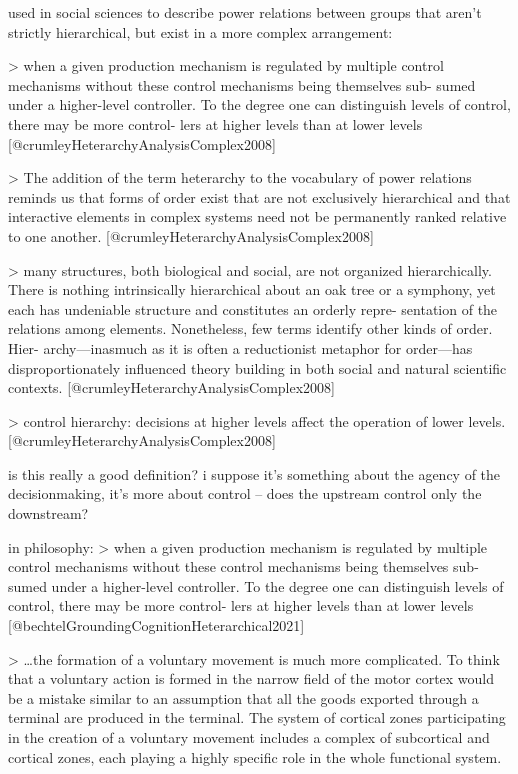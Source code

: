 \documentclass[../main.tex]{subfiles}
\begin{document}
{{used in social sciences to describe power relations between groups that aren't strictly hierarchical, but exist in a more complex arrangement:

> when a given production mechanism is regulated by multiple control mechanisms without these control mechanisms being themselves sub- sumed under a higher-level controller. To the degree one can distinguish levels of control, there may be more control- lers at higher levels than at lower levels [@crumleyHeterarchyAnalysisComplex2008]

> The addition of the term heterarchy to the vocabulary of power relations reminds us that forms of order exist that are not exclusively hierarchical and that interactive elements in complex systems need not be permanently ranked relative to one another. [@crumleyHeterarchyAnalysisComplex2008]

> many structures, both biological and social, are not organized hierarchically. There is nothing intrinsically hierarchical about an oak tree or a symphony, yet each has undeniable structure and constitutes an orderly repre- sentation of the relations among elements. Nonetheless, few terms identify other kinds of order. Hier- archy—inasmuch as it is often a reductionist metaphor for order—has disproportionately influenced theory building in both social and natural scientific contexts. [@crumleyHeterarchyAnalysisComplex2008]

> control hierarchy: decisions at higher levels affect the operation of lower levels. [@crumleyHeterarchyAnalysisComplex2008] 

is this really a good definition? i suppose it's something about the agency of the decisionmaking, it's more about control -- does the upstream control only the downstream?

in philosophy: 
> when a given production mechanism is regulated by multiple control mechanisms without these control mechanisms being themselves sub- sumed under a higher-level controller. To the degree one can distinguish levels of control, there may be more control- lers at higher levels than at lower levels [@bechtelGroundingCognitionHeterarchical2021]

> …the formation of a voluntary movement is much more complicated. To think that a voluntary action is formed in the narrow field of the motor cortex would be a mistake similar to an assumption that all the goods exported through a terminal are produced in the terminal. The system of cortical zones participating in the creation of a voluntary movement includes a complex of subcortical and cortical zones, each playing a highly specific role in the whole functional system.

}}
\end{document}
